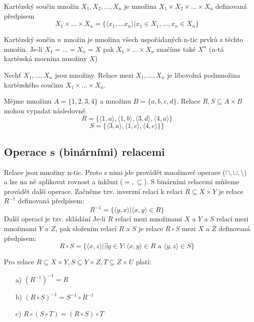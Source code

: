 \begin{definition}
Kartézský součin množin $X_1, X_2, \dots,X_n$ je množina $X_1 \times X_2 \times \dots \times X_n$ definovaná předpisem $$X_1 \times \dots \times X_n =  \{\langle x_1, \dots x_n \rangle | x_1 \in X_1, \dots, x_n \in X_n\} $$
\end{definition}
 Kartézský součin $n$ množin je množina všech uspořádaných n-tic prvků z těchto množin. Je-li $X_1 = \dots = X_n = X$ pak $X_1 \times \dots \times X_n$ značíme také $X^n$ (n-tá kartézská mocnina množiny $X$)

\begin{definition}
Nechť $X_1, \dots,X_n$ jsou množiny. Relace mezi $X_1, \dots,X_n$ je libovolná podmnožina kartézského součinu $X_1 \times \dots \times X_n $.
\end{definition}

\begin{example}
Mějme množinu $A = \{1,2,3,4\}$ a množinu $B = \{a,b,c,d\}$. Relace $R,S \subseteq A \times B$ mohou vypadat následovně. $$R = \{\langle 1, a\rangle, \langle 1, b\rangle, \langle 3, d\rangle, \langle 4, a\rangle\}$$
$$S = \{\langle 3, a\rangle, \langle 1, c\rangle,  \langle 4, c\rangle\}\}$$
\end{example}

\subsection{Operace s (binárními) relacemi}
Relace jsou množiny n-tic. Proto s nimi jde provádět množinové operace ($\cap,\cup,\setminus$) a lze na ně aplikovat rovnost a inkluzi ($=, \subseteq$).
S binárními relacemi můžeme provádět další operace. Začněme tzv. inverzní relací k relaci $R \subseteq X \times Y$ je relace $R^{-1}$ definovaná předpisem: $$R^{-1} = \{\langle y, x \rangle | \langle x, y \rangle \in R\}$$
Další operací je tzv. skládání Je-li $R$ relací mezi množinami $X$ a $Y$ a $S$ relací mezi množinami $Y$ a $Z$, pak složením relací $R$ a $S$ je relace \( R \circ S \) mezi $X$ a $Z$ definovaná předpisem: $$R \circ S = \{\langle x, z \rangle | \exists y \in Y : \langle x,y\rangle \in R \text{ a } \langle y,z \rangle \in S\}$$

\begin{sentence}
	Pro relace $R \subseteq X \times Y, S \subseteq Y \times Z, T \subseteq Z \times U$ platí:
	\begin{itemize}
		\item[a)] $(R^{-1})^{-1} = R$
		\item[b)] $(R \circ S)^{-1} = S^{-1} \circ R^{-1}$
		\item[c)] $R \circ (S \circ T) = (R \circ S) \circ T$
	\end{itemize}
\end{sentence}

